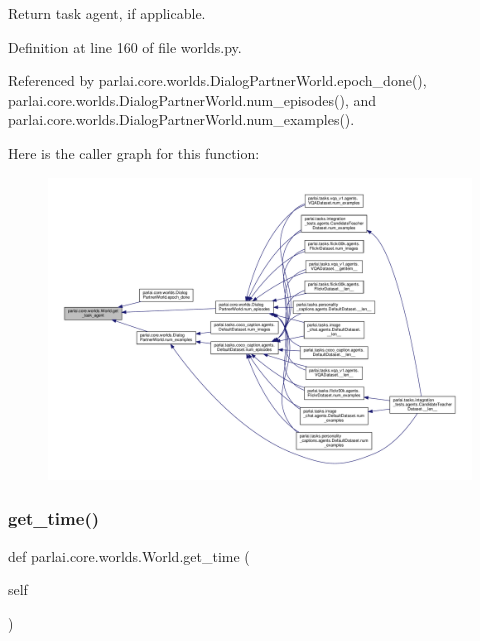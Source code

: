 \begin{DoxyVerb}Return task agent, if applicable.\end{DoxyVerb}
 

Definition at line 160 of file worlds.\+py.



Referenced by parlai.\+core.\+worlds.\+Dialog\+Partner\+World.\+epoch\+\_\+done(), parlai.\+core.\+worlds.\+Dialog\+Partner\+World.\+num\+\_\+episodes(), and parlai.\+core.\+worlds.\+Dialog\+Partner\+World.\+num\+\_\+examples().

Here is the caller graph for this function\+:
\nopagebreak
\begin{figure}[H]
\begin{center}
\leavevmode
\includegraphics[width=350pt]{classparlai_1_1core_1_1worlds_1_1World_a25ccd7740aa992bb7055bf6549574a07_icgraph}
\end{center}
\end{figure}
\mbox{\label{classparlai_1_1core_1_1worlds_1_1World_a621ed405ee96d67bc4bab781145a3daa}} 
\subsubsection{\texorpdfstring{get\+\_\+time()}{get\_time()}}
{\footnotesize\ttfamily def parlai.\+core.\+worlds.\+World.\+get\+\_\+time (\begin{DoxyParamCaption}\item[{}]{self }\end{DoxyParamCaption})}

